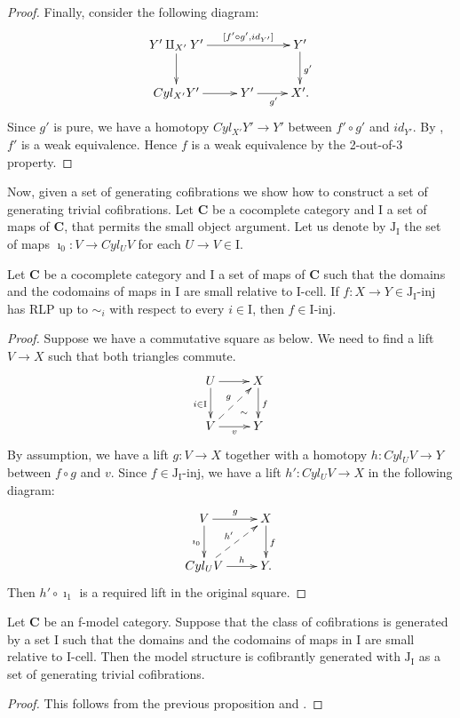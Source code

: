 \documentclass{amsart}
\theoremstyle{definition}
\newcommand{\cat}[1]{\mathbf{#1}}
\newcommand{\C}{\cat{C}}
\newcommand{\I}{\mathrm{I}}
\newcommand{\J}{\mathrm{J}}
\newcommand{\class}[2]{#1\text{-}\mathrm{#2}}
\newcommand{\Iinj}[1][\I]{\class{#1}{inj}}
\newcommand{\Icell}[1][\I]{\class{#1}{cell}}
\newcommand{\Jinj}[1][]{\Iinj[\J#1]}
\begin{document}
\begin{proof}
Finally, consider the following diagram:
\[ \xymatrix{ Y' \amalg_{X'} Y' \ar[rr]^-{[f' \circ g', id_{Y'}]} \ar[d] &                & Y' \ar[d]^{g'} \\
              Cyl_{X'} Y'       \ar[r]                                   & Y' \ar[r]_{g'} & X'.
            } \]
Since $g'$ is pure, we have a homotopy $Cyl_{X'} Y' \to Y'$ between $f' \circ g'$ and $id_{Y'}$.
By , $f'$ is a weak equivalence.
Hence $f$ is a weak equivalence by the 2-out-of-3 property.
\end{proof}

Now, given a set of generating cofibrations we show how to construct a set of generating trivial cofibrations.
Let $\C$ be a cocomplete category and $\I$ a set of maps of $\C$, that permits the small object argument.
Let us denote by $\J_\I$ the set of maps $\imath_0 : V \to Cyl_U V$ for each $U \to V \in \I$.

\begin{prop}
Let $\C$ be a cocomplete category and $\I$ a set of maps of $\C$ such that
the domains and the codomains of maps in $\I$ are small relative to $\Icell$.
If $f : X \to Y \in \Jinj[_\I]$ has RLP up to $\sim_i$ with respect to every $i \in \I$, then $f \in \Iinj$.
\end{prop}
\begin{proof}
Suppose we have a commutative square as below.
We need to find a lift $V \to X$ such that both triangles commute.
\[ \xymatrix{ U \ar[d]_{i \in \I} \ar[r] \ar@{}[dr]|(.7){\sim} & X \ar[d]^f \\
              V \ar[r]_v \ar@{-->}[ur]^g              & Y
            } \]
By assumption, we have a lift $g : V \to X$ together with
a homotopy $h : Cyl_U V \to Y$ between $f \circ g$ and $v$.
Since $f \in \Jinj[_\I]$, we have a lift $h' : Cyl_U V \to X$ in the following diagram:
\[ \xymatrix{ V \ar[r]^g \ar[d]_{\imath_0}         & X \ar[d]^f \\
              Cyl_U V \ar[r]^-h \ar@{-->}[ur]^{h'} & Y.
            } \]
Then $h' \circ \imath_1$ is a required lift in the original square.
\end{proof}

\begin{cor}
Let $\C$ be an f-model category.
Suppose that the class of cofibrations is generated by a set $\I$ such that
the domains and the codomains of maps in $\I$ are small relative to $\Icell$.
Then the model structure is cofibrantly generated with $\J_\I$ as a set of generating trivial cofibrations.
\end{cor}
\begin{proof}
This follows from the previous proposition and .
\end{proof}
\end{document}

